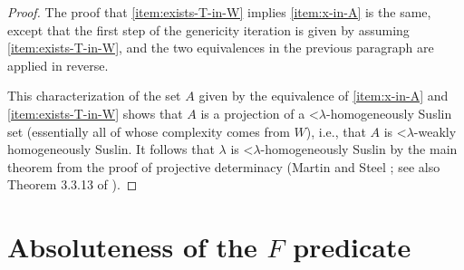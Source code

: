 \documentclass[fleqn, 11pt]{amsart}
\theoremstyle{plain}
\theoremstyle{definition}
\theoremstyle{remark}
\begin{document}
\begin{proof}
The proof that \eqref{item:exists-T-in-W} implies \eqref{item:x-in-A} is the same, except that the first step of the genericity iteration is given by assuming \eqref{item:exists-T-in-W}, and the two equivalences in the previous paragraph are applied in reverse. 
   
  This characterization of the set $A$ given by the equivalence of \eqref{item:x-in-A} and \eqref{item:exists-T-in-W} shows that $A$ is a projection of a $\mathord{<}\lambda$-homogeneously Suslin set (essentially all of whose complexity comes from $W$), i.e., that $A$ is $\mathord{<}\lambda$-weakly homogeneously Suslin. It follows that $\lambda$ is $\mathord{<}\lambda$-homogeneously Suslin by the main theorem from the proof of projective determinacy (Martin and Steel \cite[Theorem~5.11]{MarSteProjDet}; see also Theorem 3.3.13 of \cite{LarStationaryTower}).
\end{proof}

\color{black}



% 



\section{Absoluteness of the $F$ predicate}\label{sec-F-absoluteness}
\end{document}
